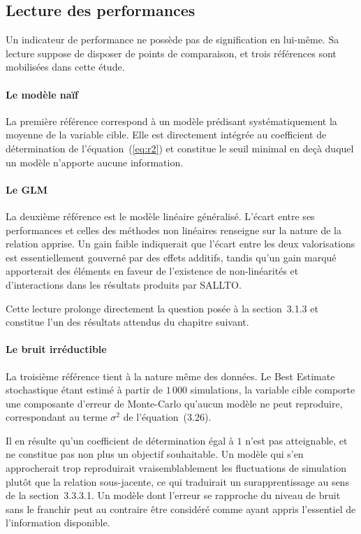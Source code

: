 \subsection{Lecture des performances}
\label{subsec:lecture-performances}

Un indicateur de performance ne possède pas de signification en lui-même. Sa lecture 
suppose de disposer de points de comparaison, et trois références sont mobilisées dans 
cette étude.

\paragraph{Le modèle naïf}
La première référence correspond à un modèle prédisant systématiquement la moyenne de la 
variable cible. Elle est directement intégrée au coefficient de détermination de 
l'équation~(\ref{eq:r2}) et constitue le seuil minimal en deçà duquel un modèle n'apporte 
aucune information.

\paragraph{Le GLM}
La deuxième référence est le modèle linéaire généralisé. L'écart entre ses performances et 
celles des méthodes non linéaires renseigne sur la nature de la relation apprise. Un gain 
faible indiquerait que l'écart entre les deux valorisations est essentiellement gouverné 
par des effets additifs, tandis qu'un gain marqué apporterait des éléments en faveur de 
l'existence de non-linéarités et d'interactions dans les résultats produits par SALLTO.

Cette lecture prolonge directement la question posée à la section~3.1.3 et constitue l'un 
des résultats attendus du chapitre suivant.

\paragraph{Le bruit irréductible}
La troisième référence tient à la nature même des données. Le Best Estimate stochastique 
étant estimé à partir de $1\,000$ simulations, la variable cible comporte une composante 
d'erreur de Monte-Carlo qu'aucun modèle ne peut reproduire, correspondant au terme 
$\sigma^2$ de l'équation~(3.26).

Il en résulte qu'un coefficient de détermination égal à $1$ n'est pas atteignable, et ne 
constitue pas non plus un objectif souhaitable. Un modèle qui s'en approcherait trop 
reproduirait vraisemblablement les fluctuations de simulation plutôt que la relation 
sous-jacente, ce qui traduirait un surapprentissage au sens de la section~3.3.3.1. Un 
modèle dont l'erreur se rapproche du niveau de bruit sans le franchir peut au contraire 
être considéré comme ayant appris l'essentiel de l'information disponible.

